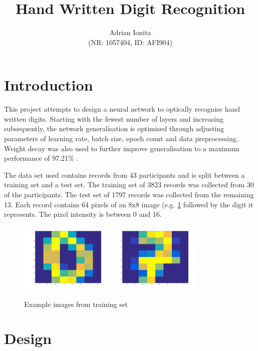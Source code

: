 \documentclass[11]{article}
\title{
  Hand Written
  Digit Recognition
  }
\date{}
\author{Adrian Ionita\\
\small{(NR: 1057404, ID: AFI904)}}
\begin{document}
\maketitle 	

\section{Introduction}
This project attempts to design a neural network to optically recognise hand written digits. Starting with the fewest number of layers and increasing subsequently, the network generalisation is optimised through adjusting parameters of learning rate, batch size, epoch count and data preprocessing. Weight decay was also used to further improve generalisation to a maximum performance of 97.21\% .

The data set used contains records from 43 participants and is split between a training set and a test set. The training set of 3823 records was collected from 30 of the participants. The test set of 1797 records was collected from the remaining 13. Each record contains 64 pixels of an 8x8 image (e.g. \ref{fig:digits} followed by the digit it represents. The pixel intensity is between 0 and 16. 

\begin{figure}[h]
\centering
\includegraphics[width=0.4\textwidth]{zero.png}
\includegraphics[width=0.4\textwidth]{seven.png}
\caption{Example images from training set}
\label{fig:digits}
\end{figure}
\section{Design}
\end{document}
